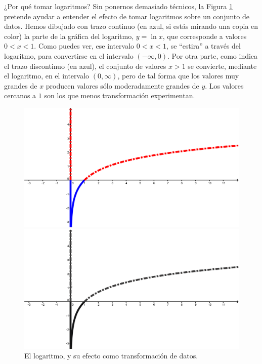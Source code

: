 ¿Por qué tomar logaritmos?  Sin ponernos demasiado técnicos, la Figura
\ref{cap09:fig:LogaritmoComoTransformacion} pretende ayudar a entender el efecto de tomar
logaritmos sobre un conjunto de datos. Hemos dibujado con trazo continuo (en azul, si estás mirando
una copia en color) la parte de la gráfica del logaritmo, $y=\ln x$, que corresponde a valores
$0<x<1$. Como puedes ver, ese intervalo $0<x<1$, se ``estira'' a través del logaritmo, para
convertirse en el intervalo $(-\infty,0)$. Por otra parte, como indica el trazo discontinuo (en
azul), el conjunto de valores $x>1$ se convierte, mediante el logaritmo, en el intervalo
$(0,\infty)$, pero de tal forma que los valores muy grandes de $x$ producen valores sólo
moderadamente grandes de $y$. Los valores cercanos a $1$ son los que menos transformación
experimentan.

\begin{figure}[htb]
\begin{center}
\begin{enColor}
\includegraphics[width=13.5cm]{../fig/Cap09-TransformacionDatosConLogaritmo.png}
\end{enColor}
\begin{bn}
\includegraphics[width=13.5cm]{../fig/Cap09-TransformacionDatosConLogaritmo-bn.png}
\end{bn}
\caption{El logaritmo, y su efecto como transformación de datos.}
\label{cap09:fig:LogaritmoComoTransformacion}
\end{center}
\end{figure}

